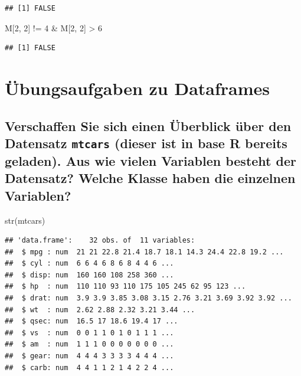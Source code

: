 \documentclass[12pt,a4paper]{article}
\newenvironment{Shaded}{\begin{snugshade}}{\end{snugshade}}
\newcommand{\DecValTok}[1]{\textcolor[rgb]{0.00,0.00,0.81}{#1}}
\newcommand{\FunctionTok}[1]{\textcolor[rgb]{0.00,0.00,0.00}{#1}}
\newcommand{\NormalTok}[1]{#1}
\newcommand{\SpecialCharTok}[1]{\textcolor[rgb]{0.00,0.00,0.00}{#1}}
\begin{document}
\begin{verbatim}
## [1] FALSE
\end{verbatim}

\begin{Shaded}
\begin{Highlighting}[]
\NormalTok{    M[}\DecValTok{2}\NormalTok{, }\DecValTok{2}\NormalTok{] }\SpecialCharTok{!=} \DecValTok{4} \SpecialCharTok{\&}\NormalTok{ M[}\DecValTok{2}\NormalTok{, }\DecValTok{2}\NormalTok{] }\SpecialCharTok{\textgreater{}} \DecValTok{6}
\end{Highlighting}
\end{Shaded}

\begin{verbatim}
## [1] FALSE
\end{verbatim}

\hypertarget{uxfcbungsaufgaben-zu-dataframes}{%
\section{Übungsaufgaben zu
Dataframes}\label{uxfcbungsaufgaben-zu-dataframes}}

\hypertarget{verschaffen-sie-sich-einen-uxfcberblick-uxfcber-den-datensatz-mtcars-dieser-ist-in-base-r-bereits-geladen.-aus-wie-vielen-variablen-besteht-der-datensatz-welche-klasse-haben-die-einzelnen-variablen}{%
\subsection{\texorpdfstring{Verschaffen Sie sich einen Überblick über
den Datensatz \texttt{mtcars} (dieser ist in base R bereits geladen).
Aus wie vielen Variablen besteht der Datensatz? Welche Klasse haben die
einzelnen
Variablen?}{Verschaffen Sie sich einen Überblick über den Datensatz mtcars (dieser ist in base R bereits geladen). Aus wie vielen Variablen besteht der Datensatz? Welche Klasse haben die einzelnen Variablen?}}\label{verschaffen-sie-sich-einen-uxfcberblick-uxfcber-den-datensatz-mtcars-dieser-ist-in-base-r-bereits-geladen.-aus-wie-vielen-variablen-besteht-der-datensatz-welche-klasse-haben-die-einzelnen-variablen}}

\begin{Shaded}
\begin{Highlighting}[]
    \FunctionTok{str}\NormalTok{(mtcars)}
\end{Highlighting}
\end{Shaded}

\begin{verbatim}
## 'data.frame':    32 obs. of  11 variables:
##  $ mpg : num  21 21 22.8 21.4 18.7 18.1 14.3 24.4 22.8 19.2 ...
##  $ cyl : num  6 6 4 6 8 6 8 4 4 6 ...
##  $ disp: num  160 160 108 258 360 ...
##  $ hp  : num  110 110 93 110 175 105 245 62 95 123 ...
##  $ drat: num  3.9 3.9 3.85 3.08 3.15 2.76 3.21 3.69 3.92 3.92 ...
##  $ wt  : num  2.62 2.88 2.32 3.21 3.44 ...
##  $ qsec: num  16.5 17 18.6 19.4 17 ...
##  $ vs  : num  0 0 1 1 0 1 0 1 1 1 ...
##  $ am  : num  1 1 1 0 0 0 0 0 0 0 ...
##  $ gear: num  4 4 4 3 3 3 3 4 4 4 ...
##  $ carb: num  4 4 1 1 2 1 4 2 2 4 ...
\end{verbatim}
\end{document}

